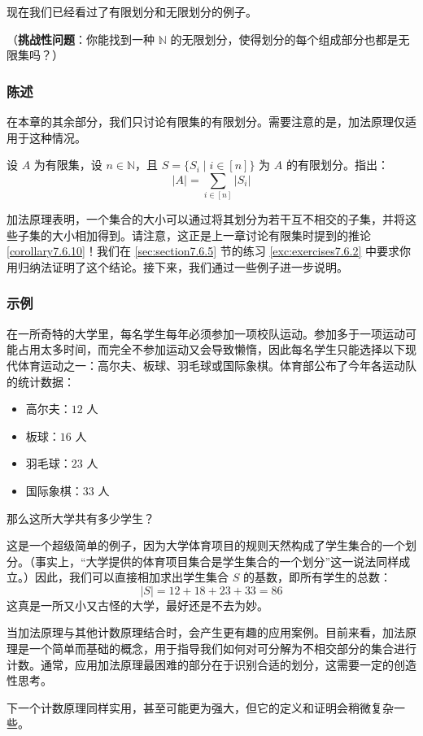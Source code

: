 现在我们已经看过了有限划分和无限划分的例子。

（\textbf{挑战性问题}：你能找到一种 $\mathbb{N}$ 的无限划分，使得划分的每个组成部分也都是无限集吗？）

\subsubsection*{陈述}

在本章的其余部分，我们只讨论有限集的有限划分。需要注意的是，加法原理仅适用于这种情况。

\begin{proposition}
    设 $A$ 为有限集，设 $n \in \mathbb{N}$，且 $S = \{S_i \mid i \in [n]\}$ 为 $A$ 的有限划分。指出：
    \[|A| = \sum_{i \in [n]} |S_i|\]
\end{proposition}

加法原理表明，一个集合的大小可以通过将其划分为若干互不相交的子集，并将这些子集的大小相加得到。请注意，这正是上一章讨论有限集时提到的推论 \ref{corollary7.6.10}！我们在 \ref{sec:section7.6.5} 节的练习 \ref{exc:exercises7.6.2} 中要求你用归纳法证明了这个结论。接下来，我们通过一些例子进一步说明。

\subsubsection*{示例}

\begin{example}
    在一所奇特的大学里，每名学生每年必须参加一项校队运动。参加多于一项运动可能占用太多时间，而完全不参加运动又会导致懒惰，因此每名学生只能选择以下现代体育运动之一：高尔夫、板球、羽毛球或国际象棋。体育部公布了今年各运动队的统计数据：
    \begin{itemize}
        \item \quad 高尔夫：$12$ 人
        \item \qquad 板球：$16$ 人
        \item \quad 羽毛球：$23$ 人
        \item 国际象棋：$33$ 人
    \end{itemize}
    那么这所大学共有多少学生？

    这是一个超级简单的例子，因为大学体育项目的规则天然构成了学生集合的一个划分。（事实上，``大学提供的体育项目集合是学生集合的一个划分''这一说法同样成立。）因此，我们可以直接相加求出学生集合 $S$ 的基数，即所有学生的总数：
    \[|S| = 12 + 18 + 23 + 33 = 86\]
    这真是一所又小又古怪的大学，最好还是不去为妙。
\end{example}

当加法原理与其他计数原理结合时，会产生更有趣的应用案例。目前来看，加法原理是一个简单而基础的概念，用于指导我们如何对可分解为不相交部分的集合进行计数。通常，应用加法原理最困难的部分在于识别合适的划分，这需要一定的创造性思考。

下一个计数原理同样实用，甚至可能更为强大，但它的定义和证明会稍微复杂一些。